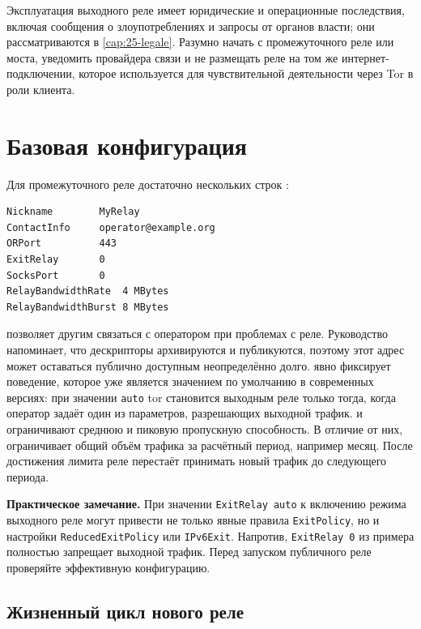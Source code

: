 \begin{attenzione}
Эксплуатация выходного реле имеет юридические и операционные последствия, включая сообщения о злоупотреблениях и запросы от органов власти; они рассматриваются в \cref{cap:25-legale}. Разумно начать с промежуточного реле или моста, уведомить провайдера связи и не размещать реле на том же интернет-подключении, которое используется для чувствительной деятельности через Tor в роли клиента.
\end{attenzione}

\section{Базовая конфигурация}\label{sec:relay-config}

Для промежуточного реле достаточно нескольких строк :
\begin{lstlisting}[numbers=none]
Nickname        MyRelay
ContactInfo     operator@example.org
ORPort          443
ExitRelay       0
SocksPort       0
RelayBandwidthRate  4 MBytes
RelayBandwidthBurst 8 MBytes
\end{lstlisting}
 позволяет другим связаться с оператором при проблемах с реле. Руководство напоминает, что дескрипторы архивируются и публикуются, поэтому этот адрес может оставаться публично доступным неопределённо долго.  явно фиксирует поведение, которое уже является значением по умолчанию в современных версиях: при значении \texttt{auto} tor становится выходным реле только тогда, когда оператор задаёт один из параметров, разрешающих выходной трафик.  и  ограничивают среднюю и пиковую пропускную способность. В отличие от них,  ограничивает общий объём трафика за расчётный период, например месяц. После достижения лимита реле перестаёт принимать новый трафик до следующего периода.

\textbf{Практическое замечание.} При значении \texttt{ExitRelay auto} к включению режима выходного реле могут привести не только явные правила \texttt{ExitPolicy}, но и настройки \texttt{ReducedExitPolicy} или \texttt{IPv6Exit}. Напротив, \texttt{ExitRelay 0} из примера полностью запрещает выходной трафик. Перед запуском публичного реле проверяйте эффективную конфигурацию.

\subsection{Жизненный цикл нового реле}

